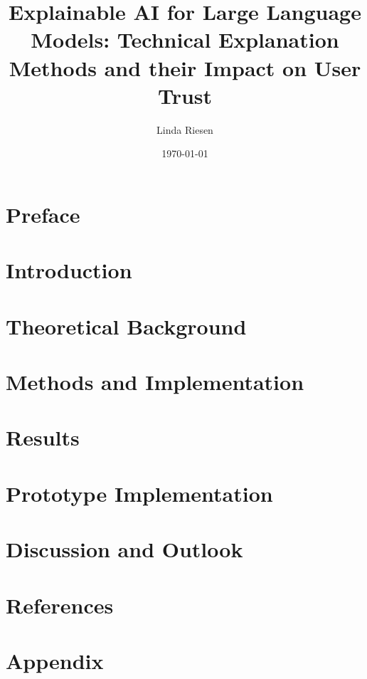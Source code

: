 \documentclass[a4paper, 11pt,abstract=on]{scrreprt}
\title{Explainable AI for Large Language Models: Technical Explanation Methods and their Impact on User Trust}
\author{Linda Riesen}
\date{\today}
\begin{document}
 

\clearpage
\setcounter{page}{1}


\begin{abstract}

\end{abstract}
\chapter*{Preface}

\tableofcontents

\chapter{Introduction}\label{ch:introduction}


\chapter{Theoretical Background}\label{ch:theory}


\chapter{Methods and Implementation}\label{ch:methods}


\chapter{Results}\label{ch:results}


\chapter{Prototype Implementation}\label{ch:prototype}


\chapter{Discussion and Outlook}\label{ch:discussion}


\chapter{References}

\appendix
\chapter{Appendix}\label{ch:anhang}

\end{document}
